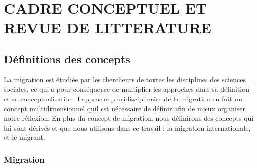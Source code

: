 \documentclass[
  letterpaper,
  DIV=11,
  numbers=noendperiod]{scrartcl}
\begin{document}
\newpage{}

\hypertarget{cadre-conceptuel-et-revue-de-litterature}{%
\section{CADRE CONCEPTUEL ET REVUE DE
LITTERATURE}\label{cadre-conceptuel-et-revue-de-litterature}}

\hypertarget{duxe9finitions-des-concepts}{%
\subsection{Définitions des
concepts}\label{duxe9finitions-des-concepts}}

La migration est étudiée par les chercheurs de toutes les disciplines
des sciences sociales, ce qui a pour conséquence de multiplier les
approches dans sa définition et sa conceptualisation.
L\textquotesingle approche pluridisciplinaire de la migration en fait un
concept multidimensionnel qu\textquotesingle il est nécessaire de
définir afin de mieux organiser notre réflexion. En plus du concept de
migration, nous définirons des concepts qui lui sont dérivés et que nous
utilisons dans ce travail : la migration internationale, et le migrant.

\hypertarget{migration}{%
\subsubsection{Migration}\label{migration}}
\end{document}
